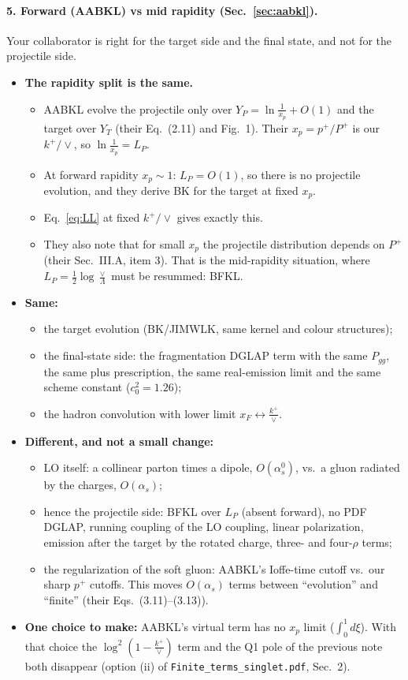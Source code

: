 \documentclass[11pt]{article}
\numberwithin{equation}{section}
\newcommand{\LP}{L_P}
\begin{document}
\paragraph{5. Forward (AABKL) vs mid rapidity (Sec.~\ref{sec:aabkl}).} Your collaborator is right for the target side and the final state, and not for the projectile side.
\begin{itemize}
\item \textbf{The rapidity split is the same.}
\begin{itemize}
\item AABKL evolve the projectile only over $Y_P=\ln\frac1{x_p}+O(1)$ and the target over $Y_T$ (their Eq.~(2.11) and Fig.~1). Their $x_p=p^+/P^+$ is our $k^+/\vee$, so $\ln\frac1{x_p}=\LP$.
\item At forward rapidity $x_p\sim1$: $\LP=O(1)$, so there is no projectile evolution, and they derive BK for the target at fixed $x_p$.
\item Eq.~\eqref{eq:LL} at fixed $k^+/\vee$ gives exactly this.
\item They also note that for small $x_p$ the projectile distribution depends on $P^+$ (their Sec.~III.A, item 3). That is the mid-rapidity situation, where $\LP=\frac12\log\frac\vee\Lambda$ must be resummed: BFKL.
\end{itemize}
\item \textbf{Same:}
\begin{itemize}
\item the target evolution (BK/JIMWLK, same kernel and colour structures);
\item the final-state side: the fragmentation DGLAP term with the same $P_{gg}$, the same plus prescription, the same real-emission limit and the same scheme constant ($c_0^2=1.26$);
\item the hadron convolution with lower limit $x_F\leftrightarrow\frac{k^+}{\vee}$.
\end{itemize}
\item \textbf{Different, and not a small change:}
\begin{itemize}
\item LO itself: a collinear parton times a dipole, $O(\alpha_s^0)$, vs.\ a gluon radiated by the charges, $O(\alpha_s)$;
\item hence the projectile side: BFKL over $\LP$ (absent forward), no PDF DGLAP, running coupling of the LO coupling, linear polarization, emission after the target by the rotated charge, three- and four-$\rho$ terms;
\item the regularization of the soft gluon: AABKL's Ioffe-time cutoff vs.\ our sharp $p^+$ cutoffs. This moves $O(\alpha_s)$ terms between ``evolution'' and ``finite'' (their Eqs.~(3.11)--(3.13)).
\end{itemize}
\item \textbf{One choice to make:} AABKL's virtual term has no $x_p$ limit ($\int_0^1d\xi$). With that choice the $\log^2(1-\frac{k^+}{\vee})$ term and the Q1 pole of the previous note both disappear (option (ii) of \texttt{Finite\_terms\_singlet.pdf}, Sec.~2).
\end{itemize}
\end{document}
